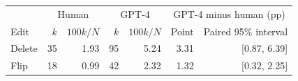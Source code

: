 \begin{tabular}{lrrrrrr}\toprule & \multicolumn{2}{c}{Human} & \multicolumn{2}{c}{GPT-4} & \multicolumn{2}{c}{GPT-4 minus human (pp)} \\ Edit & $k$ & $100k/N$ & $k$ & $100k/N$ & Point & Paired 95\% interval \\ \midrule
Delete & 35 & 1.93 & 95 & 5.24 & 3.31 & [0.87, 6.39] \\
Flip & 18 & 0.99 & 42 & 2.32 & 1.32 & [0.32, 2.25] \\
\bottomrule
\end{tabular}
